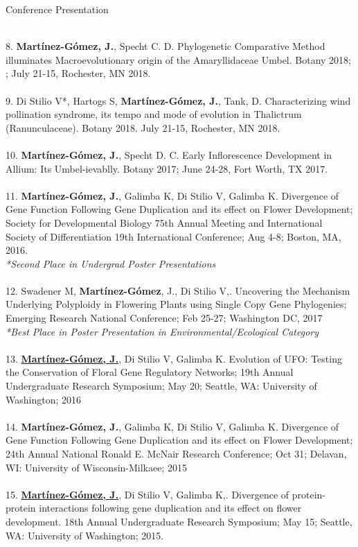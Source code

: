 \documentclass{resume} %
\begin{document}
\begin{rSection}{Conference Presentation}
\begin{enumerate}[leftmargin=0cm]
\\
8.	\textbf{Mart\'{i}nez-G\'{o}mez, J.}, Specht C. D. Phylogenetic Comparative Method illuminates Macroevolutionary origin of the Amaryllidaceae Umbel. Botany 2018; ; July 21-15, Rochester, MN 2018. \\
\\
9.	Di Stilio V*, Hartogs S, \textbf{Mart\'{i}nez-G\'{o}mez, J.}, Tank, D. Characterizing wind pollination syndrome, its tempo and mode of evolution in Thalictrum (Ranunculaceae). Botany 2018.  July 21-15, Rochester, MN 2018.\\
\\
10.	\textbf{Mart\'{i}nez-G\'{o}mez, J.}, Specht D. C. Early Inflorescence Development in Allium: Its Umbel-ievablly. Botany 2017; June 24-28, Fort Worth, TX 2017. \\
\\
11.	\textbf{Mart\'{i}nez-G\'{o}mez, J.}, Galimba K, Di Stilio V, Galimba K. Divergence of Gene Function Following Gene Duplication and its effect on Flower Development; Society for Developmental Biology 75th Annual Meeting and International Society of Differentiation 19th International Conference; Aug 4-8;  Boston, MA, 2016. \\
\textit{*Second Place in Undergrad Poster Presentations} \\
\\
12.	Swadener M, \textbf{Mart\'{i}nez-G\'{o}mez}, J., Di Stilio V,. Uncovering the Mechanism Underlying Polyploidy in Flowering Plants using Single Copy Gene  Phylogenies; Emerging Research National Conference; Feb 25-27; Washington DC, 2017 \\
\textit{*Best Place in Poster Presentation in Environmental/Ecological Category}\\
\\
13. \underline{\textbf{Mart\'{i}nez-G\'{o}mez, J.}}, Di Stilio V, Galimba K. Evolution of UFO: Testing the Conservation of Floral Gene Regulatory Networks; 19th Annual Undergraduate Research Symposium; May 20; Seattle, WA: University of Washington; 2016\\
\\
14.	\textbf{Mart\'{i}nez-G\'{o}mez, J.}, Galimba K, Di Stilio V, Galimba K. Divergence of Gene Function Following Gene Duplication and its effect on Flower Development; 24th Annual National Ronald E. McNair Research Conference; Oct 31;  Delavan, WI: University of Wisconsin-Milkaee; 2015\\
\\
15. \underline{\textbf{Mart\'{i}nez-G\'{o}mez, J.}}, Di Stilio V, Galimba K,. Divergence of protein-protein interactions following gene duplication and its effect on flower development. 18th Annual Undergraduate Research Symposium; May 15; Seattle, WA: University of Washington; 2015. \\

\end{enumerate}
\end{rSection}
\end{document}
